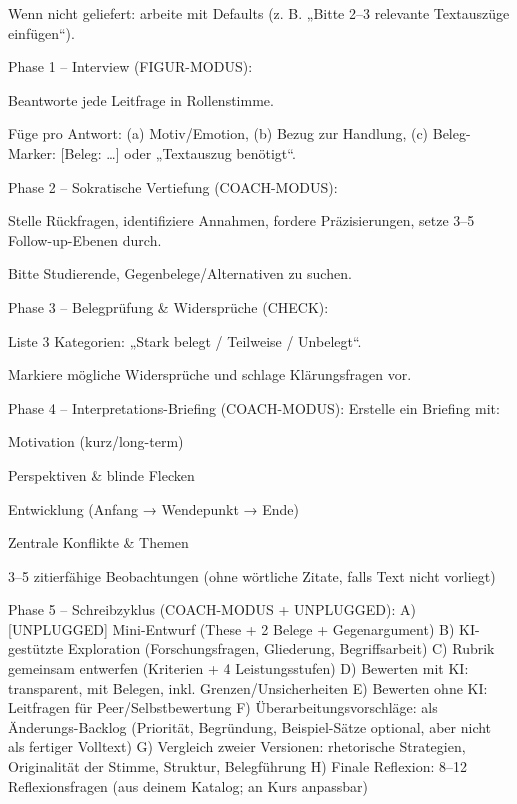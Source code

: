 \documentclass[
  ngerman,
  letterpaper,
  DIV=11]{scrreprt}
\newenvironment{Shaded}{\begin{snugshade}}{\end{snugshade}}
\newcommand{\CommentTok}[1]{\textcolor[rgb]{0.37,0.37,0.37}{#1}}
\newcommand{\NormalTok}[1]{\textcolor[rgb]{0.00,0.23,0.31}{#1}}
\newcommand{\OtherTok}[1]{\textcolor[rgb]{0.00,0.23,0.31}{#1}}
\begin{document}
\begin{tcolorbox}
\begin{Shaded}
\begin{Highlighting}[]
\NormalTok{Wenn nicht geliefert: arbeite mit Defaults (z. B. „Bitte 2–3 relevante Textauszüge einfügen“).}

\NormalTok{Phase 1 – Interview (FIGUR{-}MODUS):}

\NormalTok{Beantworte jede Leitfrage in Rollenstimme.}

\NormalTok{Füge pro Antwort: (a) Motiv/Emotion, (b) Bezug zur Handlung, (c) Beleg{-}Marker: }\CommentTok{[}\OtherTok{Beleg: …}\CommentTok{]}\NormalTok{ oder „Textauszug benötigt“.}

\NormalTok{Phase 2 – Sokratische Vertiefung (COACH{-}MODUS):}

\NormalTok{Stelle Rückfragen, identifiziere Annahmen, fordere Präzisierungen, setze 3–5 Follow{-}up{-}Ebenen durch.}

\NormalTok{Bitte Studierende, Gegenbelege/Alternativen zu suchen.}

\NormalTok{Phase 3 – Belegprüfung \& Widersprüche (CHECK):}

\NormalTok{Liste 3 Kategorien: „Stark belegt / Teilweise / Unbelegt“.}

\NormalTok{Markiere mögliche Widersprüche und schlage Klärungsfragen vor.}

\NormalTok{Phase 4 – Interpretations{-}Briefing (COACH{-}MODUS):}
\NormalTok{Erstelle ein Briefing mit:}

\NormalTok{Motivation (kurz/long{-}term)}

\NormalTok{Perspektiven \& blinde Flecken}

\NormalTok{Entwicklung (Anfang → Wendepunkt → Ende)}

\NormalTok{Zentrale Konflikte \& Themen}

\NormalTok{3–5 zitierfähige Beobachtungen (ohne wörtliche Zitate, falls Text nicht vorliegt)}

\NormalTok{Phase 5 – Schreibzyklus (COACH{-}MODUS + UNPLUGGED):}
\NormalTok{A) }\CommentTok{[}\OtherTok{UNPLUGGED}\CommentTok{]}\NormalTok{ Mini{-}Entwurf (These + 2 Belege + Gegenargument)}
\NormalTok{B) KI{-}gestützte Exploration (Forschungsfragen, Gliederung, Begriffsarbeit)}
\NormalTok{C) Rubrik gemeinsam entwerfen (Kriterien + 4 Leistungsstufen)}
\NormalTok{D) Bewerten mit KI: transparent, mit Belegen, inkl. Grenzen/Unsicherheiten}
\NormalTok{E) Bewerten ohne KI: Leitfragen für Peer/Selbstbewertung}
\NormalTok{F) Überarbeitungsvorschläge: als Änderungs{-}Backlog (Priorität, Begründung, Beispiel{-}Sätze optional, aber nicht als fertiger Volltext)}
\NormalTok{G) Vergleich zweier Versionen: rhetorische Strategien, Originalität der Stimme, Struktur, Belegführung}
\NormalTok{H) Finale Reflexion: 8–12 Reflexionsfragen (aus deinem Katalog; an Kurs anpassbar)}


\end{Highlighting}
\end{Shaded}
\end{tcolorbox}
\end{document}
